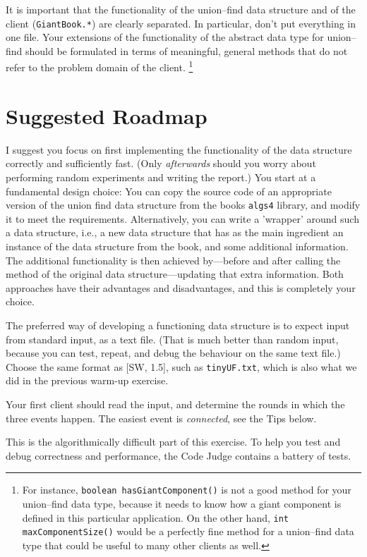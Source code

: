 \documentclass{tufte-handout}
\begin{document}
It is important that the functionality of the union--find data
structure and of the client ({\tt GiantBook.*}) are clearly
separated.
In particular, don't put everything in one file.
Your extensions of the functionality of the abstract data type for union--find should be formulated in terms of meaningful, general methods that do not refer to the problem domain of the client. 
\footnote{For instance, {\tt boolean hasGiantComponent()} is not a good method for your union--find data type, because it needs to know how a giant component is defined in this particular application. On the other hand, {\tt int maxComponentSize()} would be a perfectly fine method for a union--find data type that could be useful to many other clients as well.}

\section{Suggested Roadmap}

I suggest you focus on first implementing the functionality of the data structure correctly and sufficiently fast.
(Only \emph{afterwards} should you worry about performing random experiments and writing the report.)
You start at a fundamental design choice: You can copy the source code of an appropriate version of the union find data structure from the books \texttt{algs4} library, and modify it to meet the requirements. 
Alternatively, you can write a 'wrapper' around such a data structure, i.e., a new data structure that has as the main ingredient an instance of the data structure from the book, and some additional information. 
The additional functionality is then achieved by---before and after calling the method of the original data structure---updating that extra information.
Both approaches have their advantages and disadvantages, and this is completely your choice.

The preferred way of developing a functioning data structure is to expect input from standard input, as a text file.
(That is much better than random input, because you can test, repeat, and debug the behaviour on the same text file.)
Choose the same format as [SW, 1.5], such as \texttt{tinyUF.txt}, which is also what we did in the previous warm-up exercise.

Your first client should read the input, and determine the rounds in which the three events happen.
The easiest event is \emph{connected}, see the Tips below.

This is the algorithmically difficult part of this exercise.
To help you test and debug correctness and performance, the Code Judge contains a battery of tests.
\end{document}
